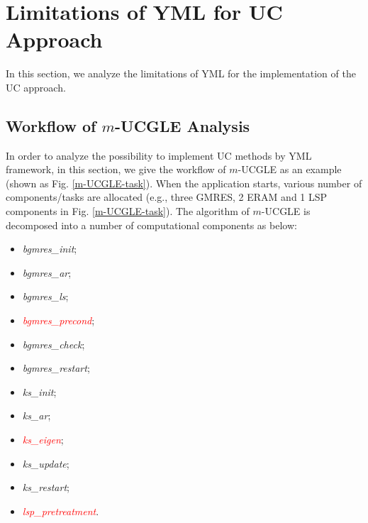 \section{Limitations of YML for UC Approach}\label{Limitations of YML for UC Approach}

In this section, we analyze the limitations of YML for the implementation of the UC approach.

\subsection{Workflow of $m$-UCGLE Analysis}

In order to analyze the possibility to implement UC methods by YML framework, in this section, we give the workflow of $m$-UCGLE as an example (shown as Fig. \ref{m-UCGLE-task}). When the application starts, various number of components/tasks are allocated (e.g., three GMRES, 2 ERAM and 1 LSP components in Fig. \ref{m-UCGLE-task}). The algorithm of $m$-UCGLE is decomposed into a number of computational components as below:

\begin{multicols}{3}
	\begin{itemize}
		\item \textit{bgmres\_init};
		\item \textit{bgmres\_ar};
		\item \textit{bgmres\_ls};
		\item \textcolor{red}{\textit{bgmres\_precond}};
		\item \textcolor{green!50!black}{\textit{bgmres\_check}};
		\item \textit{bgmres\_restart};
		\item \textit{ks\_init};
		\item \textit{ks\_ar};
		\item \textcolor{red}{\textit{ks\_eigen}};
		\item \textit{ks\_update};
		\item \textit{ks\_restart};
		\item \textcolor{red}{\textit{lsp\_pretreatment}}.
	\end{itemize}
\end{multicols}

